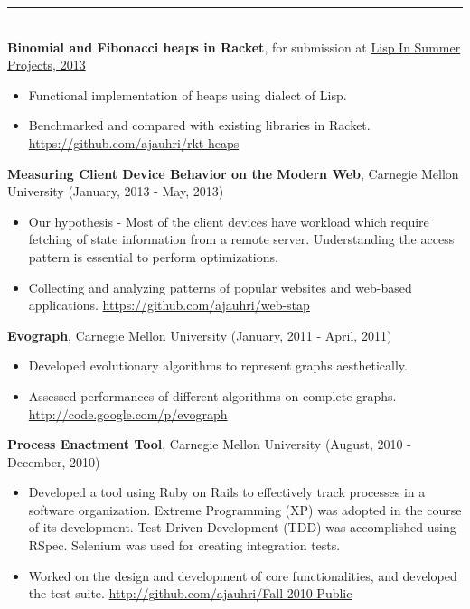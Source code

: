 \documentclass[a4paper,oneside,english]{article}
\begin{document}
\noindent\rule{6in}{0.4pt} \\[4pt]
\textbf{Binomial and Fibonacci heaps in Racket}, for submission at \href{http://lispinsummerprojects.org/}{Lisp In Summer Projects, 2013}
\begin{itemize}
	\itemsep0em
	\item Functional implementation of heaps using dialect of Lisp.
	\item Benchmarked and compared with existing libraries in Racket. \url{https://github.com/ajauhri/rkt-heaps}  
\end{itemize} \vspace*{2mm}
\noindent\textbf{Measuring Client Device Behavior on the Modern Web}, Carnegie Mellon University (January, 2013 - May, 2013)
\begin{itemize}
	\itemsep0em
	\item Our hypothesis - Most of the client devices have workload which require fetching of state information from a remote server. Understanding the access pattern is essential to perform optimizations.
	\item Collecting and analyzing patterns of popular websites and web-based applications. \url{https://github.com/ajauhri/web-stap} 
\end{itemize} \vspace*{2mm}
\noindent\textbf{Evograph}, Carnegie Mellon University (January, 2011 - April, 2011)
\begin{itemize}
	\itemsep0em
	\item Developed evolutionary algorithms to represent graphs aesthetically.
	\item Assessed performances of different algorithms on complete graphs. \url{http://code.google.com/p/evograph}
\end{itemize} \vspace*{2mm}
\noindent\textbf{Process Enactment Tool}, Carnegie Mellon University (August, 2010 - December, 2010)
\begin{itemize}
	\itemsep0em 
	\item Developed a tool using Ruby on Rails to effectively track processes in a software organization. Extreme Programming (XP) was adopted in the course of its development. Test Driven Development (TDD) was accomplished using RSpec. Selenium was used for creating integration tests.
	\item Worked on the design and development of core functionalities, and developed the test suite. \url{http://github.com/ajauhri/Fall-2010-Public}
\end{itemize} \vspace*{2mm}
\end{document}
